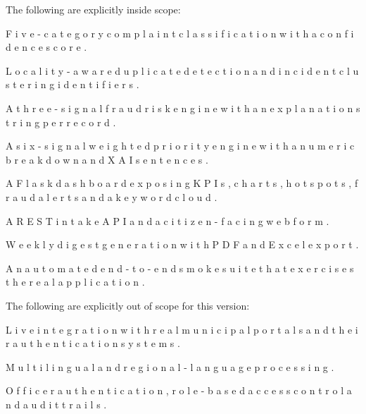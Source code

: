 \documentclass[10pt,letterpaper,oneside]{article}\usepackage{geometry}\geometry{top=1in,bottom=1in,left=1in,right=1in,includeheadfoot}\usepackage{xcolor}\definecolor{color@navy}{HTML}{1F3B63}\definecolor{color@grey}{HTML}{404040}\definecolor{color@hdr}{HTML}{F2F4F7}\usepackage{titlesec}\titleformat{\section}  {\normalfont\huge\bfseries\color@navy}  {}{0pt}{\MakeUppercase}\titleformat{\subsection}  {\normalfont\Large\bfseries\color@navy}  {}{0pt}{}\titleformat{\subsubsection}  {\normalfont\large\bfseries\color@navy}  {}{0pt}{}\titlespacing*{\section}{0pt}{14pt}{6pt}\titlespacing*{\subsection}{0pt}{10pt}{4pt}\titlespacing*{\subsubsection}{0pt}{8pt}{3pt}\setlength{\parindent}{0pt}\setlength{\parskip}{0.6em}\parindent=0pt\usepackage{enumitem}\setlist{nosep,leftmargin=*,itemsep=0pt,topsep=2pt,partopsep=0pt}\usepackage{array}\usepackage{booktabs}\usepackage{caption}\captionsetup{font={small,it},labelfont={bf},labelsep=period,  parskip=2pt,skip=4pt,list=no}\captionsetup[table]{labelfont={bf,small,color@navy},name=Table}\usepackage{graphicx}\usepackage{verbatim}\usepackage{ragged2e}\usepackage{longtable}\usepackage{tabularx}\usepackage{multirow}\usepackage{colortbl}\definecolor{rowshade}{HTML}{F2F4F7}\usepackage{tikz}\usetikzlibrary{positioning,calc}\usepackage[hidelinks]{hyperref}\hypersetup{colorlinks=true,linkcolor=color@navy,urlcolor=color@navy}\pagestyle{fancy}\fancyhf{}\renewcommand{\headrulewidth}{0.4pt}\fancyhead[L]{\small\color@navy CivicSense — Project Report}\fancyhead[R]{\small\color@grey October 11, 2026}\fancyfoot[C]{\small\color@grey An Integrated Intelligent Triage Pipelin}\fancyfoot[R]{\small\color@grey Page \thepage}\usepackage{setspace}\setstretch{1.15}\AtBeginDocument{  \hypersetup{pdftitle={An Integrated Intelligent Triage Pipeline for AI-Enhanced Citizen Complaint Management},    pdfauthor={CivicSense Project Team},    pdfsubject={Project Report},    pdfkeywords={smart cities, NLP, complaint management, e-governance},    pdfcreator={CivicSense Project Team}  }}
\begin{document}
The following are explicitly inside scope:

\item F i v e - c a t e g o r y   c o m p l a i n t   c l a s s i f i c a t i o n   w i t h   a   c o n f i d e n c e   s c o r e .

\item L o c a l i t y - a w a r e   d u p l i c a t e   d e t e c t i o n   a n d   i n c i d e n t   c l u s t e r i n g   i d e n t i f i e r s .

\item A   t h r e e - s i g n a l   f r a u d   r i s k   e n g i n e   w i t h   a n   e x p l a n a t i o n   s t r i n g   p e r   r e c o r d .

\item A   s i x - s i g n a l   w e i g h t e d   p r i o r i t y   e n g i n e   w i t h   a   n u m e r i c   b r e a k d o w n   a n d   X A I   s e n t e n c e s .

\item A   F l a s k   d a s h b o a r d   e x p o s i n g   K P I s ,   c h a r t s ,   h o t s p o t s ,   f r a u d   a l e r t s   a n d   a   k e y w o r d   c l o u d .

\item A   R E S T   i n t a k e   A P I   a n d   a   c i t i z e n - f a c i n g   w e b   f o r m .

\item W e e k l y   d i g e s t   g e n e r a t i o n   w i t h   P D F   a n d   E x c e l   e x p o r t .

\item A n   a u t o m a t e d   e n d - t o - e n d   s m o k e   s u i t e   t h a t   e x e r c i s e s   t h e   r e a l   a p p l i c a t i o n .

The following are explicitly out of scope for this version:

\item L i v e   i n t e g r a t i o n   w i t h   r e a l   m u n i c i p a l   p o r t a l s   a n d   t h e i r   a u t h e n t i c a t i o n   s y s t e m s .

\item M u l t i l i n g u a l   a n d   r e g i o n a l - l a n g u a g e   p r o c e s s i n g .

\item O f f i c e r   a u t h e n t i c a t i o n ,   r o l e - b a s e d   a c c e s s   c o n t r o l   a n d   a u d i t   t r a i l s .
\end{document}
